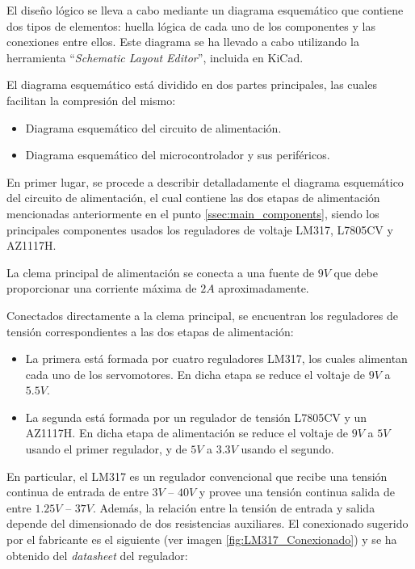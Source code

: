 El diseño lógico se lleva a cabo mediante un diagrama esquemático que contiene dos tipos de elementos: huella lógica de cada uno de los componentes y las conexiones entre ellos. Este diagrama se ha llevado a cabo utilizando la herramienta ``\textit{Schematic Layout Editor}'', incluida en KiCad.

El diagrama esquemático está dividido en dos partes principales, las cuales facilitan la compresión del mismo:
\begin{itemize}
    \item Diagrama esquemático del circuito de alimentación.
    \item Diagrama esquemático del microcontrolador y sus periféricos.
\end{itemize}

En primer lugar, se procede a describir detalladamente el diagrama esquemático del circuito de alimentación, el cual contiene las dos etapas de alimentación mencionadas anteriormente en el punto \ref{ssec:main_components}, siendo los principales componentes usados los reguladores de voltaje LM317, L7805CV y AZ1117H.

La clema principal de alimentación se conecta a una fuente de $9V$ que debe proporcionar una corriente máxima de $2A$ aproximadamente.

Conectados directamente a la clema principal, se encuentran los reguladores de tensión correspondientes a las dos etapas de alimentación:
\begin{itemize}
    \item La primera está formada por cuatro reguladores LM317, los cuales alimentan cada uno de los servomotores. En dicha etapa se reduce el voltaje de $9V$ a $5.5V$.
    
    \item La segunda está formada por un regulador de tensión L7805CV y un AZ1117H. En dicha etapa de alimentación se reduce el voltaje de $9V$ a $5V$ usando el primer regulador, y de $5V$ a $3.3V$ usando el segundo.
\end{itemize}


En particular, el LM317 es un regulador convencional que recibe una tensión continua de entrada de entre $3V$ -- $40V$ y provee una tensión continua salida de entre $1.25V$ -- $37V$. Además, la relación entre la tensión de entrada y salida depende del dimensionado de dos resistencias auxiliares. El conexionado sugerido por el fabricante es el siguiente (ver imagen \ref{fig:LM317_Conexionado}) y se ha obtenido del \textit{datasheet} del regulador:

